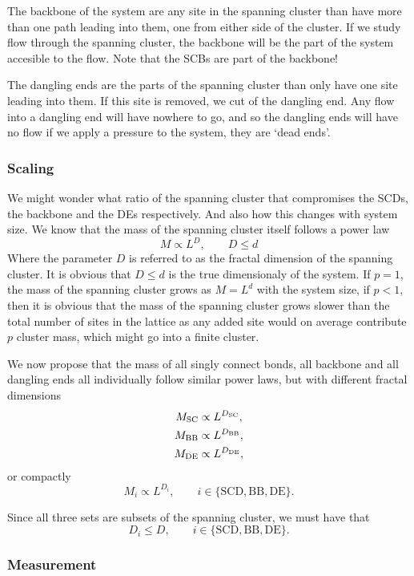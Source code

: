 \documentclass[a4paper, 11pt, notitlepage, english]{article}
\begin{document}
The backbone of the system are any site in the spanning cluster than have more than one path leading into them, one from either side of the cluster. If we study flow through the spanning cluster, the backbone will be the part of the system accesible to the flow. Note that the SCBs are part of the backbone!

The dangling ends are the parts of the spanning cluster than only have one site leading into them. If this site is removed, we cut of the dangling end. Any flow into a dangling end will have nowhere to go, and so the dangling ends will have no flow if we apply a pressure to the system, they are `dead ends'.

\subsubsection*{Scaling}

We might wonder what ratio of the spanning cluster that compromises the SCDs, the backbone and the DEs respectively. And also how this changes with system size. We know that the mass of the spanning cluster itself follows a power law
$$M \propto L^D, \qquad D \leq d$$
Where the parameter $D$ is referred to as the fractal dimension of the spanning cluster. It is obvious that $D \leq d$ is the true dimensionaly of the system. If $p=1$, the mass of the spanning cluster grows as $M = L^d$ with the system size, if $p<1$, then it is obvious that the mass of the spanning cluster grows slower than the total number of sites in the lattice as any added site would on average contribute $p$ cluster mass, which might go into a finite cluster.

We now propose that the mass of all singly connect bonds, all backbone and all dangling ends all individually follow similar power laws, but with different fractal dimensions
\begin{align*}
	M_{\rm SC} &\propto L^{D_{\rm SC}}, \\
	M_{\rm BB} &\propto L^{D_{\rm BB}}, \\
	M_{\rm DE} &\propto L^{D_{\rm DE}},
\end{align*}
or compactly
$$M_i \propto L^{D_i}, \qquad i \in \{\mbox{SCD}, \mbox{BB}, \mbox{DE}\}.$$

Since all three sets are subsets of the spanning cluster, we must have that 
$$D_i \leq D, \qquad i \in \{\mbox{SCD}, \mbox{BB}, \mbox{DE}\}.$$

\subsubsection*{Measurement}
\end{document}
